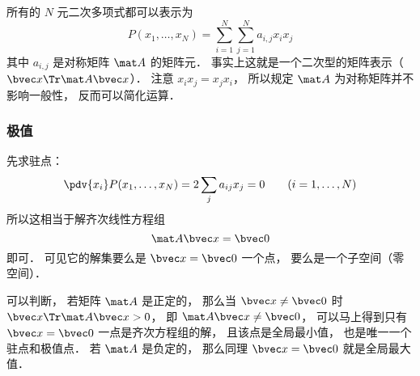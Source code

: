 

所有的 $N$ 元二次多项式都可以表示为
\begin{equation}
P(x_1,\dots,x_N) = \sum_{i=1}^N\sum_{j=1}^N a_{i,j}x_i x_j
\end{equation}
其中 $a_{i,j}$ 是对称矩阵 $\mat A$ 的矩阵元． 事实上这就是一个二次型的矩阵表示（$\bvec x\Tr \mat A \bvec x$）． 注意 $x_i x_j = x_j x_i$， 所以规定 $\mat A$ 为对称矩阵并不影响一般性， 反而可以简化运算．

\subsubsection{极值}
先求驻点：
\begin{equation}
\pdv{x_i}P(x_1,\dots,x_N) = 2\sum_j a_{ij} x_j = 0 \qquad (i = 1,\dots,N)
\end{equation}
所以这相当于解齐次线性方程组
\begin{equation}
\mat A \bvec x = \bvec 0
\end{equation}
即可． 可见它的解集要么是 $\bvec x = \bvec 0$ 一个点， 要么是一个子空间（零空间）．

可以判断， 若矩阵 $\mat A$ 是正定的， 那么当 $\bvec x \ne \bvec 0$ 时 $\bvec x\Tr \mat A \bvec x > 0$， 即 $\mat A \bvec x \ne \bvec 0$， 可以马上得到只有 $\bvec x = \bvec 0$ 一点是齐次方程组的解， 且该点是全局最小值， 也是唯一一个驻点和极值点． 若 $\mat A$ 是负定的， 那么同理 $\bvec x = \bvec 0$ 就是全局最大值．
